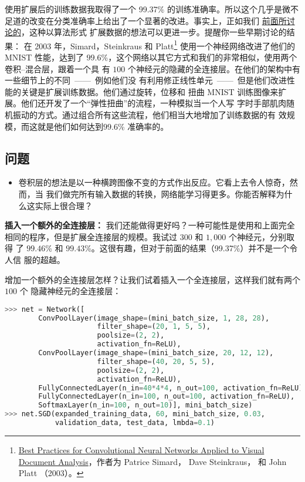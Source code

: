 使用扩展后的训练数据我取得了一个 99.37\% 的训练准确率。所以这个几乎是微不足道的改变在分类准确率上给出了一个显著的改进。事实上，正如我们%
\hyperref[sec:other_techniques_for_regularization]{前面所讨论的}，这种以算法形式
扩展数据的想法可以更进一步。提醒你一些早期讨论的结果：
在 2003 年，Simard，Steinkraus 和
Platt\footnote{\href{http://dx.doi.org/10.1109/ICDAR.2003.1227801}{Best
    Practices for Convolutional Neural Networks Applied to Visual Document
    Analysis}，作者为 Patrice Simard， Dave Steinkraus， 和 John
  Platt （2003）。} 使用一个神经网络改进了他们的 MNIST 性能，达到了
$99.6$\%，这个网络以其它方式和我们的非常相似，使用两个卷积--混合层，跟着一个具
有 $100$ 个神经元的隐藏的全连接层。在他们的架构中有一些细节上的不同~——~例如他们没
有利用修正线性单元~——~但是他们改进性能的关键是扩展训练数据。他们通过旋转，位移和
扭曲 MNIST 训练图像来扩展。他们还开发了一个“弹性扭曲”的流程，一种模拟当一个人写
字时手部肌肉随机振动的方式。通过组合所有这些流程，他们相当大地增加了训练数据的有
效规模，而这就是他们如何达到$99.6$\% 准确率的。

\subsection*{问题}

\begin{itemize}
\item 卷积层的想法是以一种横跨图像不变的方式作出反应。它看上去令人惊奇，然而，当
  我们做完所有输入数据的转换，网络能学习得更多。你能否解释为什么这实际上很合理？
\end{itemize}

\textbf{插入一个额外的全连接层：} 我们还能做得更好吗？一种可能性是使用和上面完全
相同的程序，但是扩展全连接层的规模。我试过 $300$ 和 $1,000$ 个神经元，分别取得
了 $99.46$\% 和 $99.43$\%。这很有趣，但对于前面的结果（99.37\%）并不是一个令人信
服的超越。

增加一个额外的全连接层怎样？让我们试着插入一个全连接层，这样我们就有两个 $100$ 个
隐藏神经元的全连接层：
\begin{lstlisting}[language=Python]
>>> net = Network([
        ConvPoolLayer(image_shape=(mini_batch_size, 1, 28, 28), 
                      filter_shape=(20, 1, 5, 5), 
                      poolsize=(2, 2), 
                      activation_fn=ReLU),
        ConvPoolLayer(image_shape=(mini_batch_size, 20, 12, 12), 
                      filter_shape=(40, 20, 5, 5), 
                      poolsize=(2, 2), 
                      activation_fn=ReLU),
        FullyConnectedLayer(n_in=40*4*4, n_out=100, activation_fn=ReLU),
        FullyConnectedLayer(n_in=100, n_out=100, activation_fn=ReLU),
        SoftmaxLayer(n_in=100, n_out=10)], mini_batch_size)
>>> net.SGD(expanded_training_data, 60, mini_batch_size, 0.03, 
            validation_data, test_data, lmbda=0.1)
\end{lstlisting}

